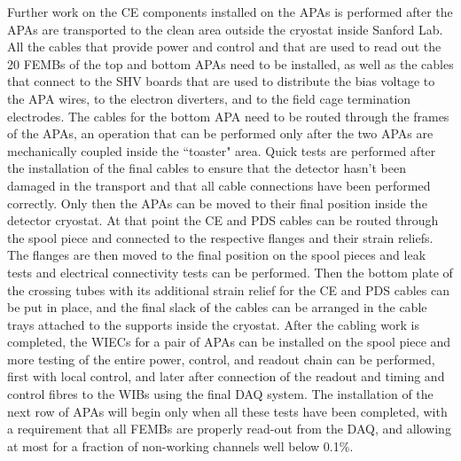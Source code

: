 Further work on the CE components installed on the APAs is performed after
the APAs are transported to the clean area outside the cryostat inside
Sanford Lab. All the cables that provide power and control and that are used
to read out the 20 FEMBs of the top and bottom APAs need to be installed,
as well as the cables that connect to the SHV boards that are used to
distribute the bias voltage to the APA wires, to the electron diverters,
and to the field cage termination electrodes. The cables for the bottom
APA need to be routed through the frames of the APAs, an operation that
can be performed only after the two APAs are mechanically coupled inside
the ``toaster" area. Quick tests are performed after the installation of the
final cables to ensure that the detector hasn't been damaged in the transport
and that all cable connections have been performed correctly. Only then 
the APAs can be moved to their final position inside
the detector cryostat. At that point the CE and PDS cables can be routed
through the spool piece and connected to the respective flanges and their strain
reliefs. The flanges are then moved to the final position on the spool pieces
and leak tests and electrical connectivity tests can be performed. Then the
bottom plate of the crossing tubes with its additional strain relief for
the CE and PDS cables can be put in place, and the final slack of the cables
can be arranged in the cable trays attached to the supports inside the cryostat.
After the cabling work is completed, the WIECs for a pair of APAs can be
installed on the spool piece and more testing of the entire power, control,
and readout chain can be performed, first with local control, and later
after connection of the readout and timing and control fibres to the WIBs
using the final DAQ system. The installation of the next row of APAs will
begin only when all these tests have been completed, with a requirement
that all FEMBs are properly read-out from the DAQ, and allowing at most for
a fraction of non-working channels well below 0.1\%. 

